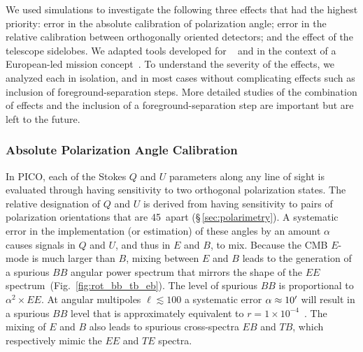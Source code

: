\documentclass[PICOReport.tex]{subfiles}
\begin{document}
We used simulations to investigate the following three effects that had the highest priority: error in the absolute calibration of polarization angle; error in the relative calibration between orthogonally oriented detectors; and the effect of the telescope sidelobes. We adapted tools developed for \planck~\cite{plank2015_xii_focalplane} and in the context of a European-led mission concept~\citep{core_systematics}. To understand the severity of the effects, we analyzed each in isolation, and in most cases without complicating effects such as inclusion of foreground-separation steps. More detailed studies of the combination of effects and the inclusion of a foreground-separation step are important but are left to the future. 


%



\subsubsection{Absolute Polarization Angle Calibration}
\label{sec:angle}

In PICO, each of the Stokes $Q$ and $U$ parameters along any line of sight is evaluated through having sensitivity to two orthogonal polarization states. The relative designation of $Q$ and $U$ is derived from having sensitivity to pairs of polarization orientations that are 45\degree\ apart (\S\,\ref{sec:polarimetry}). A systematic error in the implementation (or estimation) of these angles by an amount $\alpha$ causes signals in $Q$ and $U$, and thus in $E$ and $B$, to mix. Because the CMB $E$-mode is much larger than $B$, mixing between $E$ and $B$ leads to the generation of a spurious $BB$ angular power spectrum that mirrors the shape of the $EE$ spectrum~(Fig.~\ref{fig:rot_bb_tb_eb}). The level of spurious $BB$ is proportional to $\alpha^{2} \times EE$. At angular multipoles $\ell \lesssim 100$ a systematic error $\alpha\approx 10'$ will result in a spurious $BB$ level that is approximately equivalent to $r = 1\times10^{-4}$~\citep{shimon2008,Aumont+2018}.  The mixing of $E$ and $B$ also leads to spurious cross-spectra $EB$ and $TB$, which respectively mimic the $EE$ and $TE$ spectra. 
\end{document}
